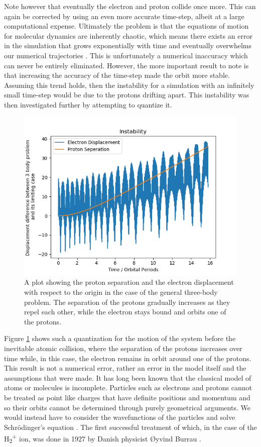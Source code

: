 \documentclass[12pt]{article} %
\numberwithin{equation}{subsection} %
\begin{document}
Note however that eventually the electron and proton collide once more. This can again be corrected by using an even more accurate time-step, albeit at a large computational expense. Ultimately the problem is that the equations of motion for molecular dynamics are inherently chaotic, which means there exists an error in the simulation that grows exponentially with time and eventually overwhelms our numerical trajectories \cite{skeel2009makes}. This is unfortunately a numerical inaccuracy which can never be entirely eliminated. However, the more important result to note is that increasing the accuracy of the time-step made the orbit more stable. Assuming this trend holds, then the instability for a simulation with an infinitely small time-step would be due to the protons drifting apart. This instability was then investigated further by attempting to quantize it.
\begin{figure}[h]
    \centering
    \captionsetup{justification=centering}
	\includegraphics[scale=0.45]{images/instability2.png}
	\caption{A plot showing the proton separation and the electron displacement with respect to the origin in the case of the general three-body problem. The separation of the protons gradually increases as they repel each other, while the electron stays bound and orbits one of the protons.}
	\label{fig: instability} 
	\end{figure}
Figure \ref{fig: instability} shows such a quantization for the motion of the system before the inevitable atomic collision, where the separation of the protons increases over time while, in this case, the electron remains in orbit around one of the protons. This result is not a numerical error, rather an error in the model itself and the assumptions that were made. It has long been known that the classical model of atoms or molecules is incomplete. Particles such as electrons and protons cannot be treated as point like charges that have definite positions and momentum and so their orbits cannot be determined through purely geometrical arguments. We would instead have to consider the wavefunctions of the particles and solve Schr\"{o}dinger's equation \cite{schrodinger1926undulatory}. The first successful treatment of which, in the case of the H\textsubscript{2}\textsuperscript{+} ion, was done in 1927 by Danish physicist \O yvind Burrau \cite{burrau1927berechnung}.
\end{document}

